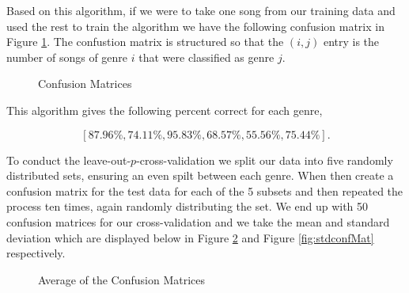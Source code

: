 \documentclass[12pt]{article}
\begin{document}
Based on this algorithm, if we were to take one song from our training data and used the rest to train the algorithm we have the following confusion matrix in Figure {\ref{fig:confMat}}.  The confustion matrix is structured so that the $(i,j)$ entry is the number of songs of genre $i$ that were classified as genre $j$.

\begin{figure}[h!]
\centering
\caption{Confusion Matrices}
\label{fig:confMat}
\end{figure}

This algorithm gives the following percent correct for each genre, 

\[  [87.96\%, 74.11\%, 95.83\%, 68.57\%, 55.56\%, 75.44\% ]. \]


To conduct the leave-out-$p$-cross-validation we split our data into five randomly distributed sets, ensuring an even spilt between each genre. When then create a confusion matrix for the test data for each of the 5 subsets and then repeated the process ten times, again randomly distributing the set. We end up with 50 confusion matrices for our cross-validation and we take the mean and standard deviation which are displayed below in Figure {\ref{fig:avgconfMat}}  and Figure {\ref{fig:stdconfMat}} respectively.
\begin{figure}[h!]
\centering

\caption{Average of the Confusion Matrices} 
\label{fig:avgconfMat}
\end{figure}
\end{document}

